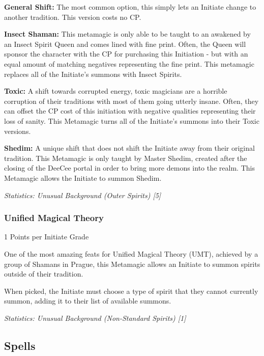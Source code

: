 \begin{multicols*}{3}
	\textbf{General Shift: } The most common option, this simply lets an Initiate change to another tradition. This version costs no CP.
	
	\textbf{Insect Shaman:}	This metamagic is only able to be taught to an awakened by an Insect Spirit Queen and comes lined with fine print. Often, the Queen will sponsor the character with the CP for purchasing this Initiation - but with an equal amount of matching negatives representing the fine print. This metamagic replaces all of the Initiate's summons with Insect Spirits.
	
	\textbf{Toxic:} A shift towards corrupted energy, toxic magicians are a horrible corruption of their traditions with most of them going utterly insane. Often, they can offset the CP cost of this initiation with negative qualities representing their loss of sanity. This Metamagic turns all of the Initiate's summons into their Toxic versions.
	
	\textbf{Shedim: } A unique shift that does not shift the Initiate away from their original tradition. This Metamagic is only taught by Master Shedim, created after the closing of the DeeCee portal in order to bring more demons into the realm. This Metamagic allows the Initiate to summon Shedim.
	
	\textcolor{OliveGreen}{\textit{Statistics: Unusual Background (Outer Spirits) [5] }}
	
	\subsubsection{Unified Magical Theory}
	\begin{flushright}
		1 Points per Initiate Grade
	\end{flushright}
	
	One of the most amazing feats for Unified Magical Theory (UMT), achieved by a group of Shamans in Prague, this Metamagic allows an Initiate to summon spirits outside of their tradition.
	
	When picked, the Initiate must choose a type of spirit that they cannot currently summon, adding it to their list of available summons.
	
	\textcolor{OliveGreen}{\textit{Statistics: Unusual Background (Non-Standard Spirits) [1] }}
	
	\subsection{Spells}
	

\end{multicols*}
